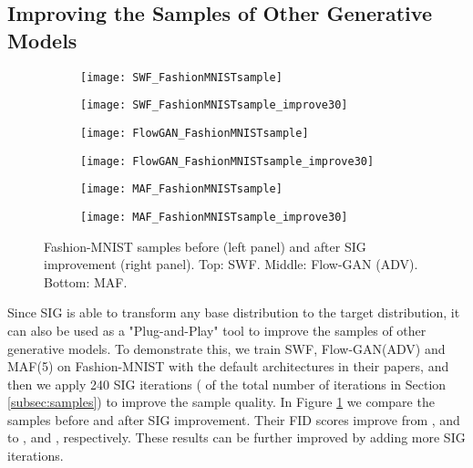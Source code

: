 \documentclass{article}
\begin{document}
\subsection{Improving the Samples of Other Generative Models}

\label{subsec:improve}



\begin{figure}
     \centering
     \begin{subfigure}[]{0.495\linewidth}
         \centering \texttt{[image: SWF\_FashionMNISTsample]}
     \end{subfigure}
     \hfill
     \begin{subfigure}[]{0.495\linewidth}
         \centering \texttt{[image: SWF\_FashionMNISTsample\_improve30]}
     \end{subfigure}
     \hfill
     \begin{subfigure}[]{0.495\linewidth}
         \centering \texttt{[image: FlowGAN\_FashionMNISTsample]}
     \end{subfigure}
     \hfill
     \begin{subfigure}[]{0.495\linewidth}
         \centering \texttt{[image: FlowGAN\_FashionMNISTsample\_improve30]}
     \end{subfigure}
     \hfill
     \begin{subfigure}[]{0.495\linewidth}
         \centering \texttt{[image: MAF\_FashionMNISTsample]}
     \end{subfigure}
     \hfill
     \begin{subfigure}[]{0.495\linewidth}
         \centering \texttt{[image: MAF\_FashionMNISTsample\_improve30]}
     \end{subfigure}
    \caption{Fashion-MNIST samples before (left panel) and after SIG improvement (right panel). Top: SWF. Middle: Flow-GAN (ADV). Bottom: MAF.}
    \label{fig:improve}
    \vskip -0.1in
\end{figure}

Since SIG is able to transform any base distribution to the target distribution, it can also be used as a "Plug-and-Play" tool to improve the samples of other generative models. To demonstrate this, we train SWF, Flow-GAN(ADV) and MAF(5) on Fashion-MNIST with the default architectures in their papers, and then we apply 240 SIG iterations ( of the total number of iterations in Section \ref{subsec:samples}) to improve the sample quality. In Figure \ref{fig:improve} we compare the samples before and after SIG improvement. Their FID scores improve from ,  and  to ,  and , respectively. These results can be further improved by adding more SIG iterations.
\end{document}
